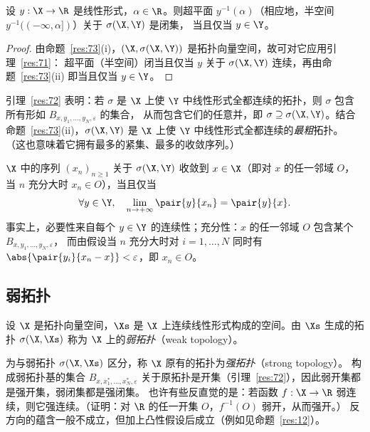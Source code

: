 \begin{corollary}
\label{res:74}
设 $y:\X\to\R$ 是线性形式，$\alpha\in\R$。则超平面 $y^{-1}(\alpha)$（相应地，半空间 $y^{-1}((-\infty,\alpha])$）关于 $\sigma(\X,\Y)$ 是闭集，
当且仅当 $y\in\Y$。
\end{corollary}

\begin{proof}
由命题~\ref{res:73}(i)，$(\X,\sigma(\X,\Y))$ 是拓扑向量空间，故可对它应用引理~\ref{res:71}：
超平面（半空间）闭当且仅当 $y$ 关于 $\sigma(\X,\Y)$ 连续，再由命题~\ref{res:73}(ii) 即当且仅当 $y\in\Y$。
\end{proof}

\begin{remark}[最粗拓扑]
\label{rem:26}
引理~\ref{res:72} 表明：若 $\sigma$ 是 $\X$ 上使 $\Y$ 中线性形式全都连续的拓扑，则 $\sigma$ 包含所有形如 $B_{x,y_1,\dots,y_N,\varepsilon}$ 的集合，
从而包含它们的任意并，即 $\sigma\supseteq\sigma(\X,\Y)$。结合命题~\ref{res:73}(ii)，$\sigma(\X,\Y)$ 是 $\X$ 上使 $\Y$ 中线性形式全都连续的\emph{最粗}拓扑。
（这也意味着它拥有最多的紧集、最多的收敛序列。）
\end{remark}

\begin{remark}[序列的收敛]
\label{rem:27}
$\X$ 中的序列 $(x_n)_{n\geqslant1}$ 关于 $\sigma(\X,\Y)$ 收敛到 $x\in\X$（即对 $x$ 的任一邻域 $O$，当 $n$ 充分大时 $x_n\in O$），当且仅当
\[
  \forall y\in\Y,\quad\lim_{n\to+\infty}\pair{y}{x_n}=\pair{y}{x}.
\]
事实上，必要性来自每个 $y\in\Y$ 的连续性；充分性：$x$ 的任一邻域 $O$ 包含某个 $B_{x,y_1,\dots,y_N,\varepsilon}$，
而由假设当 $n$ 充分大时对 $i=1,\dots,N$ 同时有 $\abs{\pair{y_i}{x_n-x}}<\varepsilon$，即 $x_n\in O$。
\end{remark}

\subsection{弱拓扑}

\begin{definition}[弱拓扑]
\label{def:38}
设 $\X$ 是拓扑向量空间，$\Xs$ 是 $\X$ 上连续线性形式构成的空间。由 $\Xs$ 生成的拓扑 $\sigma(\X,\Xs)$ 称为 $\X$ 上的\emph{弱拓扑}（weak topology）。
\end{definition}

\begin{remark}[与强拓扑的关系]
\label{rem:28}
为与弱拓扑 $\sigma(\X,\Xs)$ 区分，称 $\X$ 原有的拓扑为\emph{强拓扑}（strong topology）。
构成弱拓扑基的集合 $B_{x,x^*_1,\dots,x^*_N,\varepsilon}$ 关于原拓扑是开集（引理~\ref{res:72}），因此弱开集都是强开集，弱闭集都是强闭集。
也许有些反直觉的是：若函数 $f:\X\to\R$ 弱连续，则它强连续。（证明：对 $\R$ 的任一开集 $O$，$f^{-1}(O)$ 弱开，从而强开。）
反方向的蕴含一般不成立，但加上凸性假设后成立（例如见命题~\ref{res:12}）。
\end{remark}

